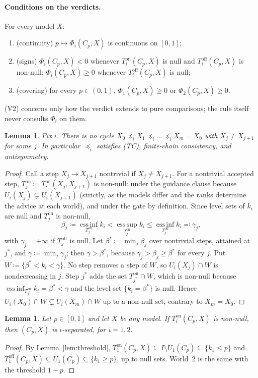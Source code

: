 \documentclass[11pt]{article}
\newtheorem{lemma}[theorem]{Lemma}
\theoremstyle{definition}\newtheorem{definition}[theorem]{Definition}
\theoremstyle{remark}\newtheorem{remark}[theorem]{Remark}
\newcommand{\on}{\mathrm{on}}
\newcommand{\off}{\mathrm{off}}
\newcommand{\esssup}{\operatorname*{ess\,sup}}
\newcommand{\essinf}{\operatorname*{ess\,inf}}
\begin{document}
\paragraph{Conditions on the verdicts.} For every model $X$:
\begin{enumerate}[label=(V\arabic*),leftmargin=*,itemsep=2pt]
\item (continuity) $p\mapsto\Phi_i(C_p,X)$ is continuous on $[0,1]$;
\item (signs) $\Phi_i(C_p,X)<0$ whenever $T^\on_i(C_p,X)$ is null and
$T^\off_i(C_p,X)$ is non-null; $\Phi_i(C_p,X)\ge0$ whenever
$T^\off_i(C_p,X)$ is null;
\item (covering) for every $p\in(0,1)$, $\Phi_1(C_p,X)\ge0$ or
$\Phi_2(C_p,X)\ge0$.
\end{enumerate}
(V2) concerns only how the verdict extends to pure comparisons; the rule
itself never consults $\Phi_i$ on them.

\begin{lemma}\label{lem:acyclic}
Fix $i$. There is no cycle $X_0\preceq_iX_1\preceq_i\dots\preceq_iX_m=X_0$ with
$X_j\ne X_{j+1}$ for some $j$. In particular $\preceq_i$ satisfies (TC),
finite-chain consistency, and antisymmetry.
\end{lemma}
\begin{proof}
Call a step $X_j\to X_{j+1}$ nontrivial if $X_j\ne X_{j+1}$. For a nontrivial
accepted step, $T^\on_j\coloneqq T^\on_i(X_j,X_{j+1})$ is non-null: under the
guidance clause because $U_i(X_j)\subsetneq U_i(X_{j+1})$ (strictly, as the
models differ and the ranks determine the advice at each world), and under the
gate by definition. Since level sets of $k_i$ are null and $T^\on_j$ is non-null,
\[
 \beta_j\coloneqq\essinf_{T^\on_j}k_i<\esssup_{T^\on_j}k_i\le
 \essinf_{T^\off_j}k_i\eqqcolon\gamma_j ,
\]
with $\gamma_j=+\infty$ if $T^\off_j$ is null. Let $\beta^*\coloneqq\min_j\beta_j$
over nontrivial steps, attained at $j^*$, and $\gamma\coloneqq\min_j\gamma_j$;
then $\gamma>\beta^*$, because $\gamma_j>\beta_j\ge\beta^*$ for every $j$. Put
$W\coloneqq\{\beta^*<k_i<\gamma\}$. No step removes a step of $W$, so
$U_i(X_j)\cap W$ is nondecreasing in $j$. Step $j^*$ adds the set
$T^\on_{j^*}\cap W$, which is non-null because $\essinf_{T^\on_{j^*}}k_i=\beta^*<\gamma$
and the level set $\{k_i=\beta^*\}$ is null. Hence
$U_i(X_0)\cap W\subsetneq U_i(X_m)\cap W$ up to a non-null set, contrary to
$X_m=X_0$.
\end{proof}

\begin{lemma}\label{lem:sep}
Let $p\in[0,1]$ and let $X$ be any model. If $T^\on_i(C_p,X)$ is non-null,
then $(C_p,X)$ is $i$-separated, for $i=1,2$.
\end{lemma}
\begin{proof}
By Lemma~\ref{lem:threshold}, $T^\on_1(C_p,X)\subseteq I\setminus U_1(C_p)
\subseteq\{k_1\le p\}$ and $T^\off_1(C_p,X)\subseteq U_1(C_p)\subseteq\{k_1\ge
p\}$, up to null sets. World~2 is the same with the threshold $1-p$.
\end{proof}
\end{document}
